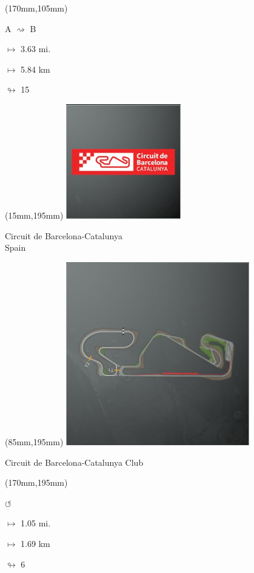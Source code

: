 \begin{textblock*}{30mm}(170mm,105mm)%
\par A $\rightsquigarrow$ B
\Large
\par$\mapsto$ 3.63 mi.
\par$\mapsto$ 5.84 km
\par$\looparrowright$ 15
\end{textblock*}
\begin{textblock*}{60mm}(15mm,195mm)%
\includegraphics[width=50mm]{LG/2015-05-20_00078.png}
\par Circuit de Barcelona-Catalunya\\ Spain
\end{textblock*}
\begin{textblock*}{80mm}(85mm,195mm)%
\includegraphics[width=80mm]{TR/2015-05-20_00020.png}
\centerline{Circuit de Barcelona-Catalunya Club}
\end{textblock*}
\begin{textblock*}{30mm}(170mm,195mm)%
\par \Huge$\circlearrowleft$
\Large
\par$\mapsto$ 1.05 mi.
\par$\mapsto$ 1.69 km
\par$\looparrowright$ 6
\end{textblock*}
\null\newpage


